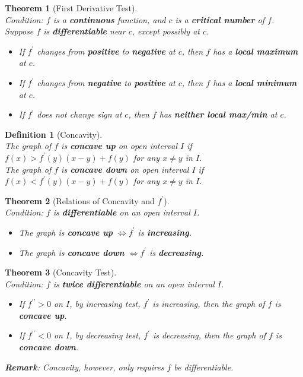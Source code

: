 \documentclass[12pt]{article}
\newtheorem{definition}{Definition}[section]
\newtheorem{theorem}{Theorem}[section]
\theoremstyle{definition}
\begin{document}
\begin{theorem}[First Derivative Test]
\hfill\\
\normalfont Condition: $f$ is a \textbf{continuous} function, and $c$ is a \textbf{critical number} of $f$. Suppose $f$ is \textbf{differentiable} near $c$, except possibly at $c$.
\begin{itemize}
\item If $f^\prime$ changes from \textbf{positive} to \textbf{negative} at $c$, then $f$ has a \textbf{local maximum} at $c$.
\item If $f^\prime$ changes from \textbf{negative} to \textbf{positive} at $c$, then $f$ has a \textbf{local minimum} at $c$.
\item If $f^\prime$ does not change sign at $c$, then $f$ has \textbf{neither local max/min} at $c$.
\end{itemize}
\end{theorem}
\begin{definition}[Concavity]
\hfill\\
\normalfont The graph of $f$ is \textbf{concave up} on open interval $I$ if $f(x) > f^\prime (y)(x - y) + f(y)$ for any $x \neq y$ in $I$.\\
The graph of $f$ is \textbf{concave down} on open interval $I$ if $f(x) < f^\prime(y)(x - y) + f(y)$ for any $x\neq y$ in $I$.
\end{definition}
\begin{theorem}[Relations of Concavity and $f^\prime$]
\hfill\\
\normalfont Condition: $f$ is \textbf{differentiable} on an open interval $I$.
\begin{itemize}
\item The graph is \textbf{concave up} $\Leftrightarrow f^\prime$ is \textbf{increasing}.
\item The graph is \textbf{concave down} $\Leftrightarrow f^\prime$ is \textbf{decreasing}.
\end{itemize}
\end{theorem}
\begin{theorem}[Concavity Test]
\hfill\\
\normalfont Condition: $f$ is \textbf{twice differentiable} on an open interval $I$.
\begin{itemize}
\item If $f^{\prime\prime} > 0 $ on $I$, by increasing test, $f^\prime$ is increasing, then the graph of $f$ is \textbf{concave up}.
\item If $f^{\prime\prime} < 0 $ on $I$, by decreasing test, $f^\prime$ is decreasing, then the graph of $f$ is \textbf{concave down}.
\end{itemize}
\textbf{Remark}: Concavity, however, only requires $f$ be differentiable.
\end{theorem}
\end{document}
